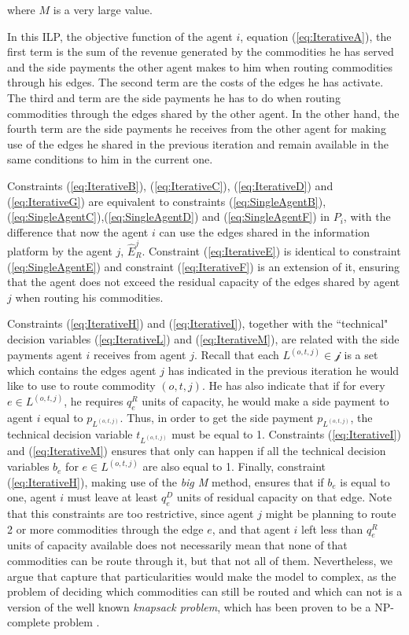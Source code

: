 \documentclass[review]{elsarticle}
\begin{document}
where $M$ is a very large value.

In this ILP, the objective function of the agent $i$, equation (\ref{eq:IterativeA}), the first term is the sum of the revenue generated by the commodities he has served and the side payments the other agent makes to him when routing commodities through his edges. The second term are the costs of the edges he has activate. The third and term are the side payments he has to do when routing commodities through the edges shared by the other agent. In the other hand, the fourth term are the side payments he receives from the other agent for making use of the edges he shared in the previous iteration and remain available in the same conditions to him in the current one. 

Constraints (\ref{eq:IterativeB}), (\ref{eq:IterativeC}), (\ref{eq:IterativeD}) and (\ref{eq:IterativeG}) are equivalent to constraints (\ref{eq:SingleAgentB}),(\ref{eq:SingleAgentC}),(\ref{eq:SingleAgentD}) and (\ref{eq:SingleAgentF}) in $P_i$, with the difference that now the agent $i$ can use the edges shared in the information platform by the agent $j$, $\widehat{E}_R^j$. Constraint (\ref{eq:IterativeE}) is identical to constraint (\ref{eq:SingleAgentE}) and constraint (\ref{eq:IterativeF}) is an extension of it, ensuring that the agent does not exceed the residual capacity of the edges shared by agent $j$ when routing his commodities.

Constraints (\ref{eq:IterativeH}) and (\ref{eq:IterativeI}), together with the ``technical" decision variables (\ref{eq:IterativeL}) and (\ref{eq:IterativeM}), are related with the side payments agent $i$ receives from agent $j$. Recall that each $L^{(o,t,j)} \in \mathcal{j}$ is a set which contains the edges agent $j$ has indicated in the previous iteration he would like to use to route commodity $(o,t,j)$. He has also indicate that if for every $e \in L^{(o,t,j)}$, he requires $q_e^R$ units of capacity, he would make a side payment to agent $i$ equal to $p_{L^{(o,t,j)}}$. Thus, in order to get the side payment $p_{L^{(o,t,j)}}$, the technical decision variable $t_{L^{(o,t,j)}}$ must be equal to 1. Constraints (\ref{eq:IterativeI}) and (\ref{eq:IterativeM}) ensures that only can happen if all the technical decision variables $b_e$ for $e \in L^{(o,t,j)}$ are also equal to 1. Finally, constraint (\ref{eq:IterativeH}), making use of the \emph{big M} method, ensures that if $b_e$ is equal to one, agent $i$ must leave at least $q_e^D$ units of residual capacity on that edge. Note that this constraints are too restrictive, since agent $j$ might be planning to route 2 or more commodities through the edge $e$, and that agent $i$ left less than $q_e^R$ units of capacity available does not necessarily mean that none of that commodities can be route through it, but that not all of them. Nevertheless, we argue that capture that particularities would make the model to complex, as the problem of deciding which commodities can still be routed and which can not is a version of the well known \emph{knapsack problem}, which has been proven to be a NP-complete problem \cite{KARP1972}.
\end{document}
